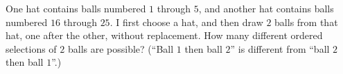 One hat contains balls numbered $1$ through $5$, and another hat contains balls numbered $16$ through $25$. I first choose a hat, and then draw $2$ balls from that hat, one after the other, without replacement. How many different ordered selections of $2$ balls are possible? (``Ball $1$ then ball $2$'' is different from ``ball $2$ then ball $1$''.)
